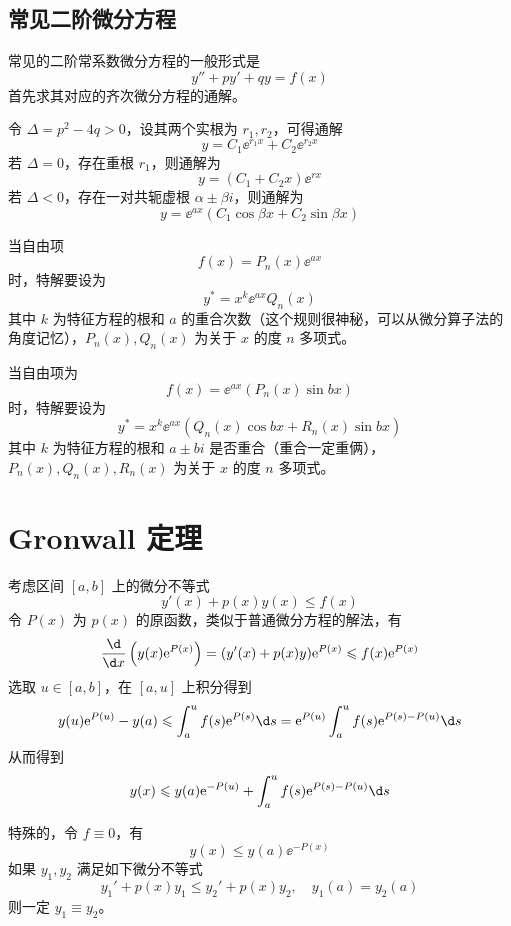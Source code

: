 \subsection{常见二阶微分方程}

常见的二阶常系数微分方程的一般形式是
\[ y'' + p y' + qy = f(x) \]
首先求其对应的齐次微分方程的通解。

令 $\Delta = p^2 - 4q > 0$，设其两个实根为 $r_1, r_2$，可得通解
\[ y = C_1 \ee^{r_1 x} + C_2 \ee^{r_2 x} \]
若 $\Delta = 0$，存在重根 $r_1$，则通解为
\[ y = (C_1 + C_2 x) \ee^{r x} \]
若 $\Delta < 0$，存在一对共轭虚根 $\alpha \pm \beta i$，则通解为
\[ y = \ee^{a x} (C_1 \cos \beta x + C_2 \sin \beta x) \]

当自由项
\[ f(x) = P_n(x) \ee^{ax} \]
时，特解要设为
\[ y^* = x^k \ee^{ax} Q_n(x) \]
其中 $k$ 为特征方程的根和 $a$ 的重合次数（这个规则很神秘，可以从微分算子法的角度记忆），$P_n(x), Q_n(x)$ 为关于 $x$ 的度 $n$ 多项式。

当自由项为
\[ f(x) = \ee^{ax} \left( P_n(x) \sin b x \right) \]
时，特解要设为
\[ y^* = x^k \ee^{ax} (Q_n(x) \cos bx + R_n(x) \sin bx) \]
其中 $k$ 为特征方程的根和 $a \pm bi$ 是否重合（重合一定重俩），$P_n(x), Q_n(x), R_n(x)$ 为关于 $x$ 的度 $n$ 多项式。

\section{Gronwall 定理}

考虑区间 $[a, b]$ 上的微分不等式
\[ y'(x) + p(x) y(x) \leqslant f(x) \]
令 $P(x)$ 为 $p(x)$ 的原函数，类似于普通微分方程的解法，有
\[ \frac{\d }{\d x} \left(y(x) \ee^{P(x)}\right) = (y'(x) + p(x) y) \ee^{P(x)} \leqslant f(x) \ee^{P(x)} \]
选取 $u \in [a, b]$，在 $[a, u]$ 上积分得到
\[ y(u) \ee^{P(u)} - y(a) \leqslant \int_{a}^{u} f(s) \ee^{P(s)} \d s = \ee^{P(u)} \int_{a}^{u} f(s) \ee^{P(s) - P(u)} \d s  \]
从而得到
\[ y(x) \leqslant y(a) \ee^{-P(u)} + \int_{a}^{u} f(s) \ee^{P(s) - P(u)} \d s \]

特殊的，令 $f \equiv 0$，有
\[ y(x) \leqslant y(a) \ee^{-P(x)} \]
如果 $y_1, y_2$ 满足如下微分不等式
\[ y_1' + p(x) y_1 \leqslant y_2' + p(x) y_2, \quad y_1(a) = y_2(a) \]
则一定 $y_1 \equiv y_2$。
